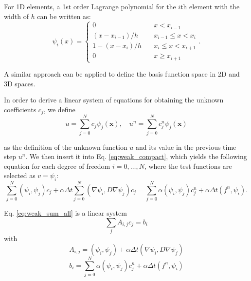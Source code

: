 For 1D elements, a 1st order Lagrange polynomial for the $i$th element with the width of $h$ can be written as:
\begin{equation}
\psi_{i}(x)=\left\{\begin{array}{cc}{0} & {\quad x<x_{i-1}} \\ {\left(x-x_{i-1}\right) / h} & {\quad x_{i-1} \leq x<x_{i}} \\ {1-\left(x-x_{i}\right) / h} & {\quad x_{i} \leq x<x_{i+1}} \\ {0} & {\quad x \geq x_{i+1}}\end{array}\right. .
\end{equation}

A similar approach can be applied to define the basis function space in 2D and 3D spaces.

In order to derive a linear system of equations for obtaining the unknown coefficients $c_j$, we define
\begin{equation} \label{eq:u_definition}
u=\sum_{j=0}^{N} c_{j} \psi_{j}(\boldsymbol{x}), \quad u^{n}=\sum_{j=0}^{N} c_{j}^{n} \psi_{j}(\boldsymbol{x})
\end{equation}

\noindent as the definition of the unknown function $u$ and its value in the previous time step $u^n$. We then insert it into Eq. \ref{eq:weak_compact}, which yields the following equation for each degree of freedom $i=0, \ldots, N$, where the test functions are selected as $v = \psi_i$:
\begin{equation} \label{eq:weak_sum_all}
\sum_{j=0}^{N}\left(\psi_{i}, \psi_{j}\right) c_{j} + \alpha \Delta t \sum_{j=0}^{N}\left(\nabla \psi_{i}, D \nabla \psi_{j}\right) c_{j} =\sum_{j=0}^{N} \alpha \left(\psi_{i}, \psi_{j}\right) c_{j}^{n}+\alpha\Delta t\left(f^{n}, \psi_{i}\right).
\end{equation}

Eq. \ref{eq:weak_sum_all} is a linear system
\begin{equation} \label{eq:linear_system}
\sum_{j} A_{i, j} c_{j}=b_{i}
\end{equation}
with
\begin{equation} \label{eq:system_a}
A_{i, j}=\left(\psi_{i}, \psi_{j}\right) + \alpha \Delta t \left(\nabla \psi_{i}, D \nabla \psi_{j}\right)
\end{equation}
\begin{equation} \label{eq:system_b}
b_{i}=\sum_{j=0}^{N}\alpha \left(\psi_{i}, \psi_{j}\right) c_{j}^{n}+\alpha \Delta t\left(f^{n}, \psi_{i}\right)
\end{equation}

